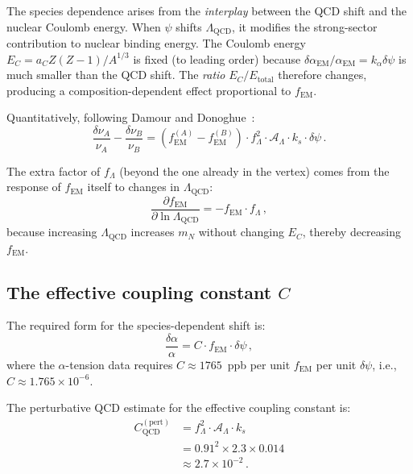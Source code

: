 \documentclass[aps,prd,twocolumn,superscriptaddress,floatfix,nofootinbib]{revtex4-2}
\newcommand{\LQCD}{\Lambda_{\mathrm{QCD}}}
\newcommand{\aem}{\alpha_{\mathrm{EM}}}
\newcommand{\fEM}{f_{\mathrm{EM}}}
\newcommand{\mN}{m_N}
\newcommand{\ka}{k_\alpha}
\newcommand{\ks}{k_s}
\newcommand{\dpsi}{\delta\psi}
\newcommand{\dalpha}{\delta\alpha}
\newcommand{\alphafine}{\alpha}
\begin{document}
The species dependence arises from the \emph{interplay} between the QCD shift
and the nuclear Coulomb energy. When $\psi$ shifts $\LQCD$, it modifies the
strong-sector contribution to nuclear binding energy. The Coulomb energy
$E_C = a_C Z(Z-1)/A^{1/3}$ is fixed (to leading order) because
$\delta\aem/\aem = \ka \dpsi$ is much smaller than the QCD shift. The
\emph{ratio} $E_C / E_{\mathrm{total}}$ therefore changes, producing a
composition-dependent effect proportional to $\fEM$.

Quantitatively, following Damour and Donoghue~\cite{Damour2010}:
\begin{equation}
\frac{\delta\nu_A}{\nu_A} - \frac{\delta\nu_B}{\nu_B}
= \left(\fEM^{(A)} - \fEM^{(B)}\right) \cdot f_\Lambda^2 \cdot
  \mathcal{A}_\Lambda \cdot \ks \cdot \dpsi \, .
\label{eq:species_diff}
\end{equation}

The extra factor of $f_\Lambda$ (beyond the one already in the vertex)
comes from the response of $\fEM$ itself to changes in $\LQCD$:
\begin{equation}
\frac{\partial \fEM}{\partial \ln\LQCD} = -\fEM \cdot f_\Lambda \, ,
\label{eq:fEM_response}
\end{equation}
because increasing $\LQCD$ increases $\mN$ without changing $E_C$, thereby
decreasing $\fEM$.

\subsection{The effective coupling constant $C$}\label{sec:C_effective}

The required form for the species-dependent shift is:
\begin{equation}
\frac{\dalpha}{\alphafine} = C \cdot \fEM \cdot \dpsi \, ,
\label{eq:C_def}
\end{equation}
where the $\alpha$-tension data requires $C \approx 1765$~ppb per unit
$\fEM$ per unit $\dpsi$, i.e., $C \approx 1.765 \times 10^{-6}$.

The perturbative QCD estimate for the effective coupling constant is:
\begin{align}
C_{\mathrm{QCD}}^{(\mathrm{pert})}
&= f_\Lambda^2 \cdot \mathcal{A}_\Lambda \cdot \ks \nonumber \\
&= 0.91^2 \times 2.3 \times 0.014 \nonumber \\
&\approx 2.7 \times 10^{-2} \, .
\label{eq:C_QCD}
\end{align}
\end{document}
